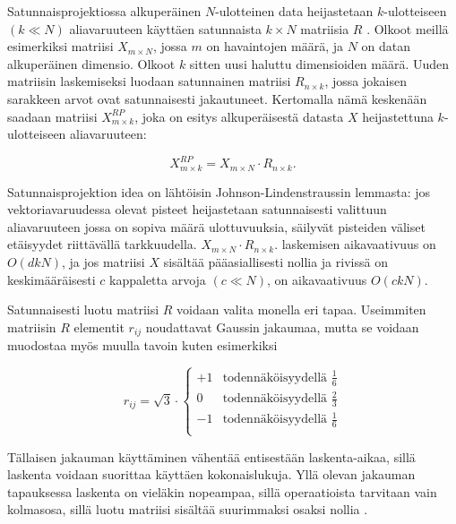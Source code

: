 Satunnaisprojektiossa alkuperäinen $N$-ulotteinen data heijastetaan $k$-ulotteiseen $(k \ll N)$ aliavaruuteen käyttäen satunnaista $k \times N$ matriisia $R$ \cite{Random}. Olkoot meillä esimerkiksi matriisi 
$X_{m\times N}$, jossa $m$ on havaintojen määrä, ja $N$ on datan alkuperäinen dimensio. Olkoot  $k$  sitten uusi haluttu dimensioiden määrä. Uuden matriisin laskemiseksi luodaan satunnainen matriisi 
$R_{n \times k}$, jossa jokaisen sarakkeen arvot ovat satunnaisesti jakautuneet. Kertomalla nämä keskenään saadaan matriisi $X_{m \times k}^{RP}$, joka on esitys alkuperäisestä datasta $X$ heijastettuna $k$-ulotteiseen 
aliavaruuteen:

\begin{equation}
X_{m \times k}^{RP} = X_{m \times N} \cdot R_{n \times k}.
\label{RP}
\end{equation}

Satunnaisprojektion idea on lähtöisin Johnson-Lindenstraussin lemmasta: jos vektoriavaruudessa olevat pisteet heijastetaan satunnaisesti valittuun aliavaruuteen jossa on sopiva määrä ulottuvuuksia, säilyvät pisteiden
väliset etäisyydet riittävällä tarkkuudella. $X_{m \times N} \cdot R_{n \times k}.$ laskemisen aikavaativuus on $O(dkN)$, ja jos matriisi $X$ sisältää pääasiallisesti nollia ja rivissä on keskimääräisesti $c$ kappaletta arvoja 
$(c \ll N)$, on aikavaativuus $O(ckN)$.

Satunnaisesti luotu matriisi $R$ voidaan valita monella eri tapaa. Useimmiten matriisin $R$ elementit $r_{ij}$ noudattavat Gaussin jakaumaa, mutta se voidaan muodostaa myös muulla tavoin kuten esimerkiksi

\begin{equation}
r_{ij} = \sqrt{3}\cdot 
\begin{cases}
 +1 &\text{todennäköisyydellä $\frac{1}{6}$} \\
 0 &\text{todennäköisyydellä $\frac{2}{3}$} \\
 -1 &\text{todennäköisyydellä $\frac{1}{6}$} \\
\end{cases}
\label{RPChoice}
\end{equation}

Tällaisen jakauman käyttäminen vähentää entisestään laskenta-aikaa, sillä laskenta voidaan suorittaa käyttäen kokonaislukuja. Yllä olevan jakauman tapauksessa laskenta on vieläkin nopeampaa, sillä operaatioista
tarvitaan vain kolmasosa, sillä luotu matriisi sisältää suurimmaksi osaksi nollia \cite{Random}.
